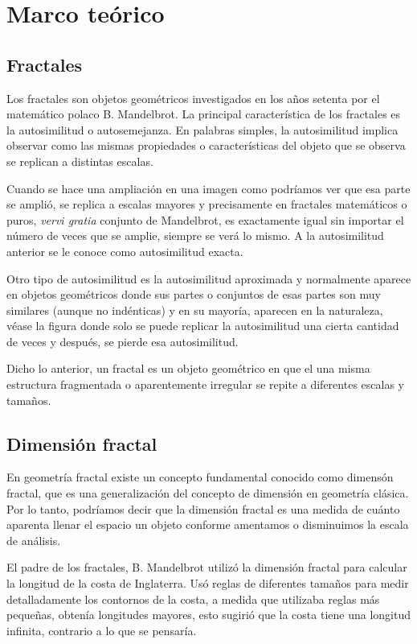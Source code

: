 \chapter{Marco te\'{o}rico}

\section{Fractales}

Los fractales son objetos geom\'{e}tricos investigados en los años setenta por el matem\'{a}tico polaco B.  Mandelbrot. La principal caracter\'{i}stica de los fractales es la autosimilitud o autosemejanza. En palabras simples, la autosimilitud implica observar como las mismas propiedades o caracter\'{i}sticas del objeto que se observa se replican a distintas escalas.

Cuando se hace una ampliaci\'{o}n en una imagen como  podr\'{i}amos ver que esa parte se ampli\'{o}, se replica a escalas mayores y precisamente en fractales matem\'{a}ticos o puros, \textit{vervi gratia} conjunto de Mandelbrot, es exactamente igual sin importar el n\'{u}mero de veces que se amplie, siempre se ver\'{a} lo mismo. A la autosimilitud anterior se le conoce como autosimilitud exacta.

Otro tipo de autosimilitud es la autosimilitud aproximada y normalmente aparece en objetos geom\'{e}tricos donde sus partes o conjuntos de esas partes son muy similares (aunque no ind\'{e}nticas) y en su mayor\'{i}a, aparecen en la naturaleza, v\'{e}ase la figura donde solo se puede replicar la autosimilitud una cierta cantidad de veces y despu\'{e}s, se pierde esa autosimilitud.

Dicho lo anterior, un fractal es un objeto geom\'{e}trico en que el una misma estructura fragmentada o aparentemente irregular se repite a diferentes escalas y tamaños. 

\section{Dimensi\'{o}n fractal}

En geometr\'{i}a fractal existe un concepto fundamental conocido como dimens\'{o}n fractal, que es una generalizaci\'{o}n del concepto de dimensi\'{o}n en geometr\'{i}a cl\'{a}sica. Por lo tanto, podr\'{i}amos decir que la dimensi\'{o}n fractal es una medida de cu\'{a}nto aparenta llenar el espacio un objeto conforme amentamos o disminuimos la escala de an\'{a}lisis.

El padre de los fractales, B. Mandelbrot utiliz\'{o} la dimensi\'{o}n fractal para calcular la longitud de la costa de Inglaterra. Us\'{o} reglas de diferentes tamaños para medir detalladamente los contornos de la costa, a medida que utilizaba reglas m\'{a}s pequeñas, obten\'{i}a longitudes mayores, esto sugiri\'{o} que la costa tiene una longitud infinita, contrario a lo que se pensar\'{i}a. 

